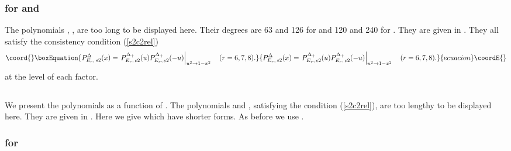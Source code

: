 \documentclass[a4paper,12pt]{article}
\providecommand{\vT}{\vphantom{\mbox{\twozero I}}}
\begin{document}
\subsubsection{\coordHE{} for \coordHE{} and \coordHE{}}

The polynomials \coordHE{}, \coordHE{},
\coordHE{} are too long to be displayed here.
Their degrees are 63 and 126 for \coordHE{} and 120 and 240 for \coordHE{}.
They are given in \cite{poly}. They all satisfy the consistency condition
(\ref{s2c2rel})
\begin{equation}\coord{}\boxEquation{
   P_{E_r,\,s2}^{{\Delta}}(x)=
   \left.\vT P_{E_r,\,c2}^{{\Delta}_+}(u)P_{E_r,\,c2}^{{\Delta}_+}(-u)
   \right|_{u^2\to1-x^2}\quad (r=6,7,8).
}{
   P_{E_r,\,s2}^{{\Delta}}(x)=
   \left.\vT P_{E_r,\,c2}^{{\Delta}_+}(u)P_{E_r,\,c2}^{{\Delta}_+}(-u)
   \right|_{u^2\to1-x^2}\quad (r=6,7,8).
}{ecuacion}\coordE{}\end{equation}
at the level of each factor.

\subsection{\coordHE{}}

We present the polynomials as a function of \coordHE{}.
The polynomials \coordHE{} and
\coordHE{}, satisfying the condition
(\ref{s2c2rel}), are too lengthy to be displayed here.
They are given in \cite{poly}.
Here we give \coordHE{} which have shorter
forms. As before we use \coordHE{}.

\subsubsection{\coordHE{} for \coordHE{}}
\end{document}
